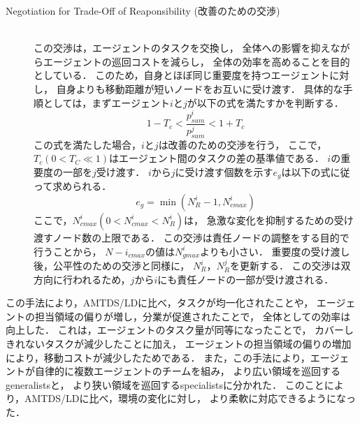 \documentclass[12pt,a4j,twoside]{jarticle}
\begin{document}
\begin{description}
    \item[Negotiation for Trade-Off of Reaponsibility (改善のための交渉)]\mbox{}\\
      この交渉は，エージェントのタスクを交換し，
      全体への影響を抑えながらエージェントの巡回コストを減らし，
      全体の効率を高めることを目的としている．
      このため，自身とほぼ同じ重要度を持つエージェントに対し，
      自身よりも移動距離が短いノードをお互いに受け渡す．
      具体的な手順としては，まずエージェント$i$と$j$が以下の式を満たすかを判断する．
      \begin{equation}
        1 - T_c < \dfrac{p^i_{sum}}{p^j_{sum}} < 1 + T_c
      \end{equation}
      この式を満たした場合，$i$と$j$は改善のための交渉を行う，
      ここで，$T_c(0 < T_C \ll 1)$はエージェント間のタスクの差の基準値である．
      $i$の重要度の一部を$j$受け渡す．
      $i$から$j$に受け渡す個数を示す$e_g$は以下の式に従って求められる．
      \begin{equation}
        e_g = \min(N^i_R-1, N^i_{cmax})
      \end{equation}
      ここで，$N^i_{cmax}(0 < N^i_{cmax} < N^i_R)$は，
      急激な変化を抑制するための受け渡すノード数の上限である．
      この交渉は責任ノードの調整をする目的で行うことから，
      $N-i_{cmax}$の値は$N^i_{gmax}$よりも小さい．
      重要度の受け渡し後，公平性のための交渉と同様に，
      $N^i_R$，$N^j_R$を更新する．
      この交渉は双方向に行われるため，$j$から$i$にも責任ノードの一部が受け渡される．

  \end{description}
  この手法により，AMTDS/LDに比べ，タスクが均一化されたことや，
  エージェントの担当領域の偏りが増し，分業が促進されたことで，
  全体としての効率は向上した．
  これは，エージェントのタスク量が同等になったことで，
  カバーしきれないタスクが減少したことに加え，
  エージェントの担当領域の偏りの増加により，移動コストが減少したためである．
  また，この手法により，エージェントが自律的に複数エージェントのチームを組み，
  より広い領域を巡回するgeneralistsと，
  より狭い領域を巡回するspecialistsに分かれた．
  このことにより，AMTDS/LDに比べ，環境の変化に対し，
  より柔軟に対応できるようになった．
\end{document}
